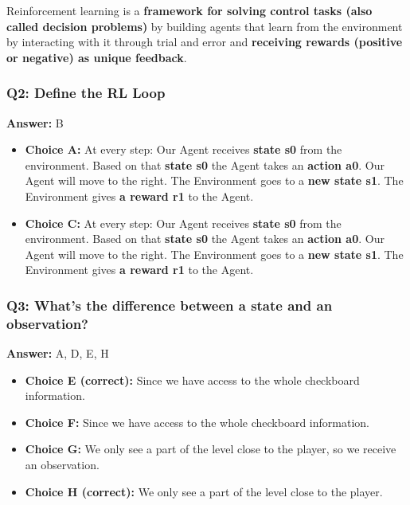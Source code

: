 \documentclass[11pt,a4paper]{article}
\begin{document}
Reinforcement learning is a \textbf{framework for solving control tasks (also called decision problems)} by building agents that learn from the environment by interacting with it through trial and error and \textbf{receiving rewards (positive or negative) as unique feedback}.

\subsubsection{Q2: Define the RL Loop}\label{q2-define-the-rl-loop-1}

\textbf{Answer:} B

\begin{itemize}
\item
  \textbf{Choice A:} At every step: Our Agent receives \textbf{state s0} from the environment. Based on that \textbf{state s0} the Agent takes an \textbf{action a0}. Our Agent will move to the right. The Environment goes to a \textbf{new state s1}. The Environment gives \textbf{a reward r1} to the Agent.
\item
  \textbf{Choice C:} At every step: Our Agent receives \textbf{state s0} from the environment. Based on that \textbf{state s0} the Agent takes an \textbf{action a0}. Our Agent will move to the right. The Environment goes to a \textbf{new state s1}. The Environment gives \textbf{a reward r1} to the Agent.
\end{itemize}

\subsubsection{Q3: What's the difference between a state and an observation?}\label{q3-whats-the-difference-between-a-state-and-an-observation-1}

\textbf{Answer:} A, D, E, H

\begin{itemize}
\item
  \textbf{Choice E (correct):} Since we have access to the whole checkboard information.
\item
  \textbf{Choice F:} Since we have access to the whole checkboard information.
\item
  \textbf{Choice G:} We only see a part of the level close to the player, so we receive an observation.
\item
  \textbf{Choice H (correct):} We only see a part of the level close to the player.
\end{itemize}
\end{document}

